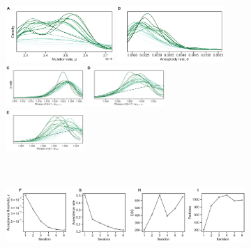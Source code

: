 \documentclass[12pt]{extarticle}
\begin{document}
\begin{figure}[p]

  \begin{subfigure}{1\textwidth}
    \centering
      \includegraphics[width=0.45\textwidth]{../figures/convergence-p1_mr.pdf}      
      \includegraphics[width=0.45\textwidth]{../figures/convergence-p2_tr.pdf} \\     
      \includegraphics[width=0.325\textwidth]{../figures/convergence-p3_w1.pdf}      
      \includegraphics[width=0.325\textwidth]{../figures/convergence-p4_w2.pdf}      
      \includegraphics[width=0.325\textwidth]{../figures/convergence-p5_w3.pdf}      
     \label{fig:convergence-A}
    \end{subfigure}
    \\    
  \begin{subfigure}{1\textwidth}
  	\includegraphics[width=\textwidth]{../figures/ess.pdf}

\end{subfigure}
\end{figure}
\end{document}
